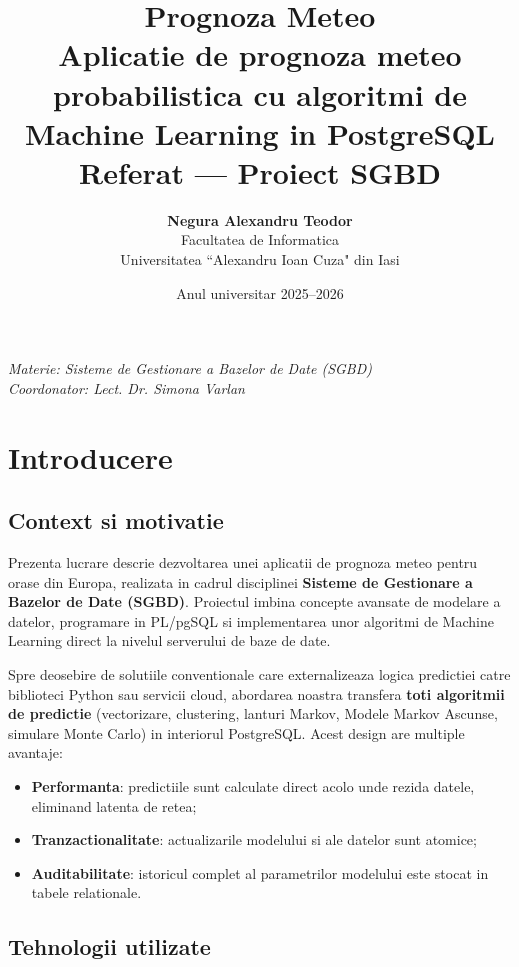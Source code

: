 \documentclass[12pt,a4paper]{article}
\title{\Huge\textbf{Prognoza Meteo}\\[0.3cm]
\Large Aplicatie de prognoza meteo probabilistica cu algoritmi de Machine Learning in PostgreSQL\\[0.5cm]
\large Referat --- Proiect SGBD}
\author{
\textbf{Negura Alexandru Teodor}\\
Facultatea de Informatica\\
Universitatea ``Alexandru Ioan Cuza" din Iasi
}
\date{Anul universitar 2025--2026}
\begin{document}
\maketitle
\thispagestyle{empty}
\vfill
\begin{center}
\textit{Materie: Sisteme de Gestionare a Bazelor de Date (SGBD)}\\
\textit{Coordonator: Lect. Dr. Simona Varlan}
\end{center}
\newpage

\tableofcontents
\newpage

\section{Introducere}

\subsection{Context si motivatie}

Prezenta lucrare descrie dezvoltarea unei aplicatii de prognoza meteo pentru orase din Europa, realizata in cadrul disciplinei \textbf{Sisteme de Gestionare a Bazelor de Date (SGBD)}. Proiectul imbina concepte avansate de modelare a datelor, programare in PL/pgSQL si implementarea unor algoritmi de Machine Learning direct la nivelul serverului de baze de date.

Spre deosebire de solutiile conventionale care externalizeaza logica predictiei catre biblioteci Python sau servicii cloud, abordarea noastra transfera \textbf{toti algoritmii de predictie} (vectorizare, clustering, lanturi Markov, Modele Markov Ascunse, simulare Monte Carlo) in interiorul PostgreSQL. Acest design are multiple avantaje:
\begin{itemize}[noitemsep]
    \item \textbf{Performanta}: predictiile sunt calculate direct acolo unde rezida datele, eliminand latenta de retea;
    \item \textbf{Tranzactionalitate}: actualizarile modelului si ale datelor sunt atomice;
    \item \textbf{Auditabilitate}: istoricul complet al parametrilor modelului este stocat in tabele relationale.
\end{itemize}

\subsection{Tehnologii utilizate}
\end{document}
